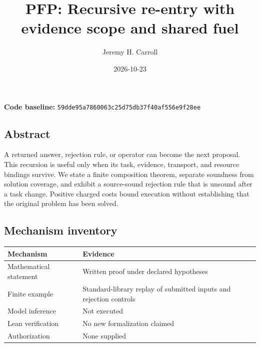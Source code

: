 \documentclass[
  11pt,
]{article}
\title{PFP: Recursive re-entry with evidence scope and shared fuel}
\author{Jeremy H. Carroll}
\date{2026-10-23}
\begin{document}
\makeatletter
\begin{center}
{\LARGE \@title\par}
\vspace{0.8em}
{\normalsize \@author\par}
\vspace{0.5em}
{\small \@date\par}
\end{center}
\makeatother

\textbf{Code baseline:}
\nolinkurl{59dde95a7860063c25d75db37f40af556e9f28ee}

\subsection{Abstract}\label{abstract}

A returned answer, rejection rule, or operator can become the next
proposal. This recursion is useful only when its task, evidence,
transport, and resource bindings survive. We state a finite composition
theorem, separate soundness from solution coverage, and exhibit a
source-sound rejection rule that is unsound after a task change.
Positive charged costs bound execution without establishing that the
original problem has been solved.

\subsection{Mechanism inventory}\label{mechanism-inventory}

\begin{longtable}[]{@{}
  >{\raggedright\arraybackslash}p{}
  >{\raggedright\arraybackslash}p{}@{}}
\toprule\noalign{}
\begin{minipage}[b]{\linewidth}\raggedright
Mechanism
\end{minipage} & \begin{minipage}[b]{\linewidth}\raggedright
Evidence
\end{minipage} \\
\midrule\noalign{}
\endhead
\bottomrule\noalign{}
\endlastfoot
Mathematical statement & Written proof under declared hypotheses \\
Finite example & Standard-library replay of submitted inputs and
rejection controls \\
Model inference & Not executed \\
Lean verification & No new formalization claimed \\
Authorization & None supplied \\
\end{longtable}
\end{document}

